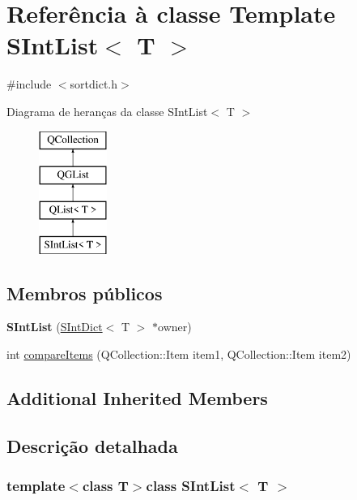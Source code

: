 \hypertarget{class_s_int_list}{\section{Referência à classe Template S\-Int\-List$<$ T $>$}
\label{class_s_int_list}
}


{\ttfamily \#include $<$sortdict.\-h$>$}

Diagrama de heranças da classe S\-Int\-List$<$ T $>$\begin{figure}[H]
\begin{center}
\leavevmode
\includegraphics[height=4.000000cm]{class_s_int_list}
\end{center}
\end{figure}
\subsection*{Membros públicos}
\begin{DoxyCompactItemize}
\item 
\hypertarget{class_s_int_list_a22a9fbe80b1ac805825a16b9f72f28fc}{{\bfseries S\-Int\-List} (\hyperlink{class_s_int_dict}{S\-Int\-Dict}$<$ T $>$ $\ast$owner)}\label{class_s_int_list_a22a9fbe80b1ac805825a16b9f72f28fc}

\item 
int \hyperlink{class_s_int_list_a219450accf048597ffc7113ecde4c402}{compare\-Items} (Q\-Collection\-::\-Item item1, Q\-Collection\-::\-Item item2)
\end{DoxyCompactItemize}
\subsection*{Additional Inherited Members}


\subsection{Descrição detalhada}
\subsubsection*{template$<$class T$>$class S\-Int\-List$<$ T $>$}

